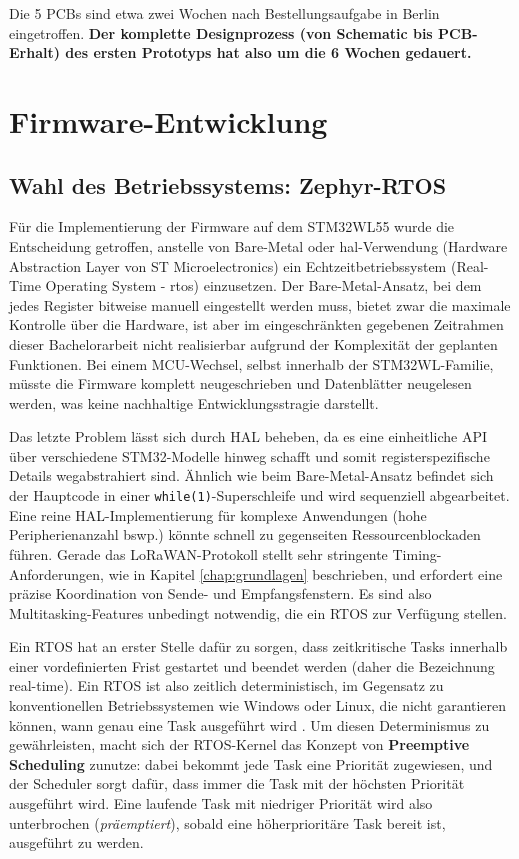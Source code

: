 Die 5 PCBs sind etwa zwei Wochen nach Bestellungsaufgabe in Berlin eingetroffen. 
\textbf{Der komplette Designprozess (von Schematic bis PCB-Erhalt) des ersten Prototyps hat also um die 6 Wochen gedauert.}

\section{Firmware-Entwicklung}

\subsection{Wahl des Betriebssystems: Zephyr-RTOS} 
\label{subsec:whyzephyr}

Für die Implementierung der Firmware auf dem STM32WL55 wurde die Entscheidung getroffen, 
anstelle von Bare-Metal oder \acrshort{hal}-Verwendung (Hardware Abstraction Layer von ST Microelectronics) 
ein Echtzeitbetriebssystem (Real-Time Operating System - \acrshort{rtos}) einzusetzen. Der Bare-Metal-Ansatz, bei dem
jedes Register bitweise manuell eingestellt werden muss, bietet zwar die maximale Kontrolle über die Hardware, 
ist aber im eingeschränkten gegebenen Zeitrahmen dieser Bachelorarbeit nicht realisierbar aufgrund der Komplexität 
der geplanten Funktionen.
Bei einem MCU-Wechsel, selbst innerhalb der STM32WL-Familie, müsste die Firmware komplett neugeschrieben 
und Datenblätter neugelesen werden, was keine nachhaltige Entwicklungsstragie darstellt.

Das letzte Problem lässt sich durch HAL beheben, da es eine einheitliche API über verschiedene STM32-Modelle hinweg schafft und somit registerspezifische Details wegabstrahiert
sind. Ähnlich wie beim Bare-Metal-Ansatz befindet sich der Hauptcode in einer \verb|while(1)|-Superschleife und wird sequenziell
abgearbeitet. Eine reine HAL-Implementierung für komplexe Anwendungen (hohe Peripherienanzahl bswp.) könnte schnell
zu gegenseiten Ressourcenblockaden führen. Gerade das LoRaWAN-Protokoll stellt sehr stringente Timing-Anforderungen, wie in Kapitel
\ref{chap:grundlagen} beschrieben, und erfordert eine präzise Koordination von Sende- und Empfangsfenstern. Es sind also 
Multitasking-Features unbedingt notwendig, die ein RTOS zur Verfügung stellen. 

Ein RTOS hat an erster Stelle dafür zu sorgen, dass zeitkritische Tasks innerhalb einer vordefinierten Frist gestartet und 
beendet werden (daher die Bezeichnung real-time). Ein RTOS ist also zeitlich deterministisch, im Gegensatz zu konventionellen
Betriebssystemen wie Windows oder Linux, die nicht garantieren können, wann genau eine Task ausgeführt wird \cite{amosHandsonRTOSMicrocontrollers2020}.
Um diesen Determinismus zu gewährleisten, macht sich der RTOS-Kernel das Konzept von \textbf{Preemptive Scheduling} zunutze:
dabei bekommt jede Task eine Priorität zugewiesen, und der Scheduler sorgt dafür, 
dass immer die Task mit der höchsten Priorität ausgeführt wird. Eine laufende Task mit niedriger Priorität wird also unterbrochen 
(\emph{präemptiert}), sobald eine höherprioritäre Task bereit ist, ausgeführt zu werden. 

